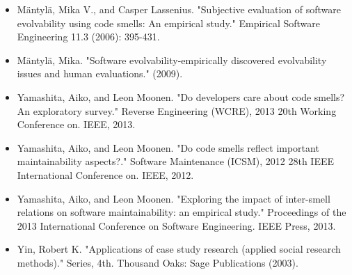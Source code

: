 \documentclass[english,12pt,a4paper,pdftex,sci,utf8]{aaltothesis}
\begin{document}
\begin{itemize}
\item Mäntylä, Mika V., and Casper Lassenius. "Subjective evaluation of software evolvability using code smells: An empirical study." Empirical Software Engineering 11.3 (2006): 395-431.

\item Mäntylä, Mika. "Software evolvability-empirically discovered evolvability issues and human evaluations." (2009).

\item Yamashita, Aiko, and Leon Moonen. "Do developers care about code smells? An exploratory survey." Reverse Engineering (WCRE), 2013 20th Working Conference on. IEEE, 2013.

\item Yamashita, Aiko, and Leon Moonen. "Do code smells reflect important maintainability aspects?." Software Maintenance (ICSM), 2012 28th IEEE International Conference on. IEEE, 2012.

\item Yamashita, Aiko, and Leon Moonen. "Exploring the impact of inter-smell relations on software maintainability: an empirical study." Proceedings of the 2013 International Conference on Software Engineering. IEEE Press, 2013.

\item Yin, Robert K. "Applications of case study research (applied social research methods)." Series, 4th. Thousand Oaks: Sage Publications (2003).
\end{itemize}

\clearpage

\printbibliography[heading=bibintoc, title={References}]
\end{document}
